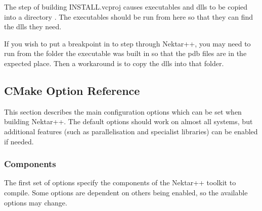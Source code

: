 \begin{notebox}
The step of building INSTALL.vcproj causes executables and dlls to be copied
into a directory .
The executables should be run from here so that they can find the dlls they need.
\end{notebox}

If you wish to put a breakpoint in to step through Nektar++, you may need to run
from the folder the executable was built in so that the pdb files are in the
expected place. Then a workaround is to copy the dlls into that folder.

\subsection{CMake Option Reference}
\label{s:installation:source:cmake}
This section describes the main configuration options which can be set when
building Nektar++. The default options should work on almost all systems, but
additional features (such as parallelisation and specialist libraries) can be
enabled if needed.

\subsubsection{Components}
The first set of options specify the components of the Nektar++ toolkit to
compile. Some options are dependent on others being enabled, so the available
options may change.

